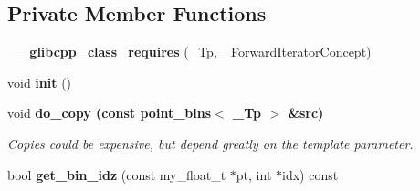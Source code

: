 \subsection*{Private Member Functions}
\begin{CompactItemize}
\item 
\textbf{\_\-\_\-glibcpp\_\-class\_\-requires} (\_\-Tp, \_\-Forward\-Iterator\-Concept)\label{classASCbase_1_1point__bins_59eab23f4ede0549e5ca1a44b58f9588}

\item 
void \textbf{init} ()\label{classASCbase_1_1point__bins_2de8967933c976d7e8569695ced43111}

\item 
void \bf{do\_\-copy} (const \bf{point\_\-bins}$<$ \_\-Tp $>$ \&src)
\begin{CompactList}\small\item\em Copies could be expensive, but depend greatly on the template parameter. \item\end{CompactList}\item 
bool \textbf{get\_\-bin\_\-idz} (const my\_\-float\_\-t $\ast$pt, int $\ast$idx) const \label{classASCbase_1_1point__bins_1a6812d16a3aed4df67ea89b4ef3795b}

\end{CompactItemize}
